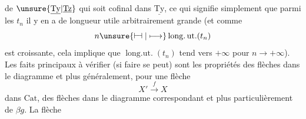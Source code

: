 de $\unsure{\underline{\mathrm{Ty}}|\underline{\mathrm{Tz}}}$ qui soit cofinal dans $\underline{\mathrm{Ty}}$, ce qui signifie
simplement que parmi les $t_n$ il y en a de longueur
utile arbitrairement grande (et comme
\[
n\unsure{\mathrel{\vdash\!\dashv}|\longmapsto}\operatorname{long.ut.}(t_n)
\]
est croissante, cela implique que $\operatorname{long.ut.}(t_n)$
tend vers $+\infty$ pour $n\longrightarrow+\infty$).  Les
faits principaux à vérifier  (si faire se peut)
sont les propriétés  des flèches
dans le diagramme
et plus généralement, pour une flèche 
\[
X'\xrightarrow{f}X
\]
dans $\mathrm{Cat}$,  des flèches dans le diagramme
correspondant
et plus particulièrement de $\beta g$. La flèche
